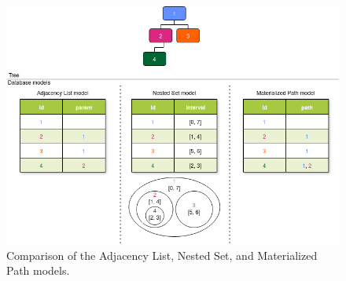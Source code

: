 \begin{figure}[H]
	\centering
	\includegraphics[scale=0.6]{./images/tree-map.drawio.png}
	\caption{Comparison of the Adjacency List, Nested Set, and Materialized Path models.}
\end{figure}

\newcommand{\goodcomplexity}[1]{\vspace{.4em}\textcolor{darkgreen}{\checkmark}\vspace{.4em}}
\newcommand{\mediumcomplexity}[1]{\vspace{.4em}\textcolor{orange}{\textcircled{}}\vspace{.4em}}
\newcommand{\badcomplexity}[1]{\vspace{.4em}\textcolor{red}{X}\vspace{.4em}}

\newcommand{\goodefficency}[1]{\textcolor{darkgreen}{\checkmark}}
\newcommand{\mediumefficency}[1]{\textcolor{orange}{\textcircled{}}}
\newcommand{\badefficency}[1]{\textcolor{red}{X}}

